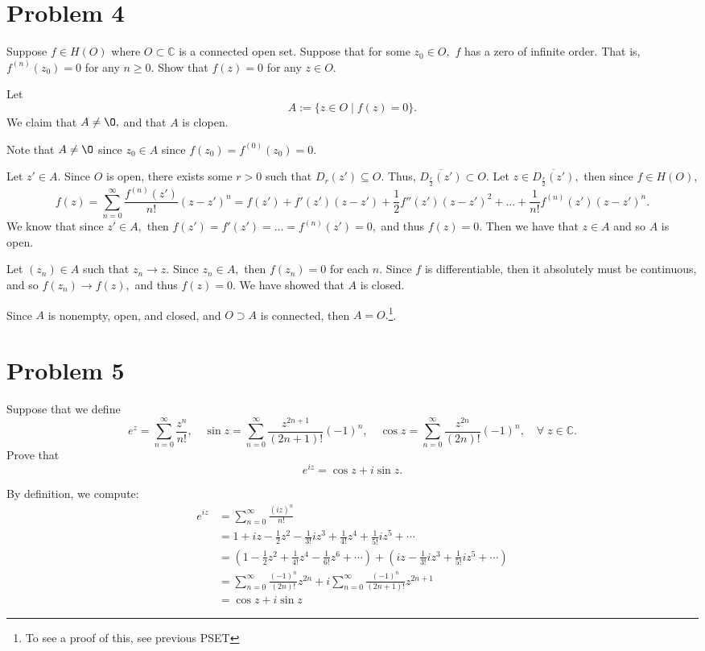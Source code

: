 \documentclass[11pt]{article}
\newcommand{\bbC}{\mathbb{C}}
\renewcommand{\emptyset}{\O}
\begin{document}
\newpage
\section*{Problem 4}
\begin{problem}
    Suppose $f \in H(O)$ where $O \subset \bbC$ is a connected open set. Suppose that for some $z_0 \in O,$ $f$ has a zero of infinite order. That is, $f^{(n)}(z_0) = 0$ for any $n\geq 0.$ Show that $f(z) = 0$ for any $z\in O.$
\end{problem}
\begin{solution}
Let 
\[A:= \{z \in O \mid f(z) = 0\}.\] We claim that $A \neq \emptyset,$ and that $A$ is clopen. 

Note that $A\neq \emptyset$ since $z_0 \in A$ since $f(z_0) = f^{(0)}(z_0) =0.$

Let $z'\in A.$ Since $O$ is open, there exists some $r>0$ such that $D_r(z')\subseteq O.$ Thus, $\overline{D_{\frac{r}{2}}(z')}\subset O.$ Let $z\in \overline{D_{\frac{r}{2}}(z')},$ then since $f\in H(O)$, 
\[f(z) = \sum_{n=0}^\infty \frac{f^{(n)}(z')}{n!}(z - z')^n = f(z') + f'(z')(z - z') + \frac{1}{2}f''(z')(z-z')^2 + \dots + \frac{1}{n!}f^{(n)}(z')(z - z')^n.\]
We know that since $z' \in A,$ then $f(z') = f'(z') = \dots = f^{(n)}(z') = 0,$ and thus $f(z) = 0.$ Then we have that $z \in A$ and so $A$ is open. 

Let $(z_n) \in A$ such that $z_n \to z.$ Since $z_n \in A,$ then $f(z_n) = 0$ for each $n.$ Since $f$ is differentiable, then it absolutely must be continuous, and so $f(z_n) \to f(z),$ and thus $f(z) = 0.$ We have showed that $A$ is closed.

Since $A$ is nonempty, open, and closed, and $O\supset A$ is connected, then $A = O.$\footnote{To see a proof of this, see previous PSET}. 
\end{solution}

\newpage
\section*{Problem 5}
\begin{problem}
    Suppose that we define 
    \[e^{z} = \sum_{n=0}^\infty \frac{z^n}{n!}, \quad \sin z = \sum_{n=0}^\infty \frac{z^{2n +1}}{(2n+1)!}(-1)^n, \quad \cos z = \sum_{n=0}^\infty \frac{z^{2n}}{(2n)!}(-1)^n, \quad \forall \; z\in \bbC.\] Prove that 
    \[e^{iz} = \cos z + i\sin z.\]
\end{problem}
\begin{solution}
 By definition, we compute:
 \begin{align*}
 e^{iz} &= \sum_{n=0}^\infty \frac{(iz)^n}{n!}\\
 &= 1 + iz - \frac{1}{2} z^2 - \frac{1}{3!}iz^3 + \frac{1}{4!}z^4 + \frac{1}{5!} iz^5 + \cdots\\
 &= (1 - \frac{1}{2}z^2 + \frac{1}{4!}z^4 - \frac{1}{6!}z^6 + \cdots) + (iz - \frac{1}{3!}iz^3 + \frac{1}{5!}iz^5+ \cdots)\\
 &= \sum_{n=0}^\infty \frac{(-1)^{n}}{(2n)!}z^{2n}  + i\sum_{n=0}^\infty \frac{(-1)^{n}}{(2n+1)!}z^{2n+1}\\
 &= \cos z + i\sin z
 \end{align*}
 
\end{solution}
\newpage
\end{document}
